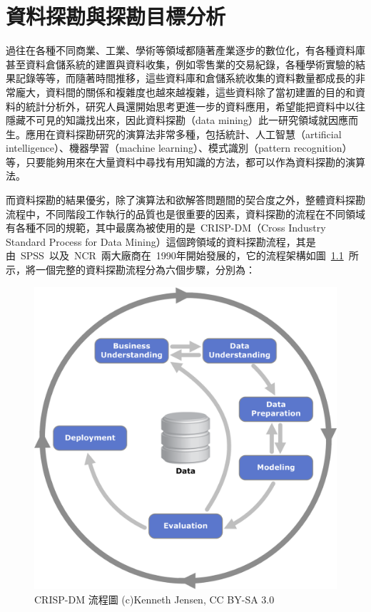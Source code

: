 \renewcommand\thetable{\arabic{chapter}-\arabic{table}}
\renewcommand{\theequation}{\arabic{chapter}-\arabic{equation}}
\chapter{資料探勘與探勘目標分析}
\label{cha:data-mining} 

過往在各種不同商業、工業、學術等領域都隨著產業逐步的數位化，有各種資料庫甚至資料倉儲系統的建置與資料收集，例如零售業的交易紀錄，各種學術實驗的結果記錄等等，而隨著時間推移，這些資料庫和倉儲系統收集的資料數量都成長的非常龐大，資料間的關係和複雜度也越來越複雜，這些資料除了當初建置的目的和資料的統計分析外，研究人員還開始思考更進一步的資料應用，希望能把資料中以往隱藏不可見的知識找出來，因此資料探勘（data mining）此一研究領域就因應而生。應用在資料探勘研究的演算法非常多種，包括統計、人工智慧（artificial intelligence）、機器學習（machine learning）、模式識別（pattern recognition）等，只要能夠用來在大量資料中尋找有用知識的方法，都可以作為資料探勘的演算法。

而資料探勘的結果優劣，除了演算法和欲解答問題間的契合度之外，整體資料探勘流程中，不同階段工作執行的品質也是很重要的因素，資料探勘的流程在不同領域有各種不同的規範，其中最廣為被使用的是~CRISP-DM\cite{shearer2000crisp}（Cross Industry Standard Process for Data Mining）這個跨領域的資料探勘流程，其是由~SPSS~以及~NCR~兩大廠商在~1990年開始發展的，它的流程架構如圖~\ref{fig:CRISP-DM}\cite{crispdmdiagram}~所示，將一個完整的資料探勘流程分為六個步驟，分別為：

\begin{figure}[hbtp]
  \begin{center}
    \includegraphics[width=1.0\textwidth]{figures/1196px-CRISP-DM_Process_Diagram.png}
    \caption{CRISP-DM 流程圖 (c)Kenneth Jensen, CC BY-SA 3.0} 
    \label{fig:CRISP-DM}
  \end{center}
\end{figure}

